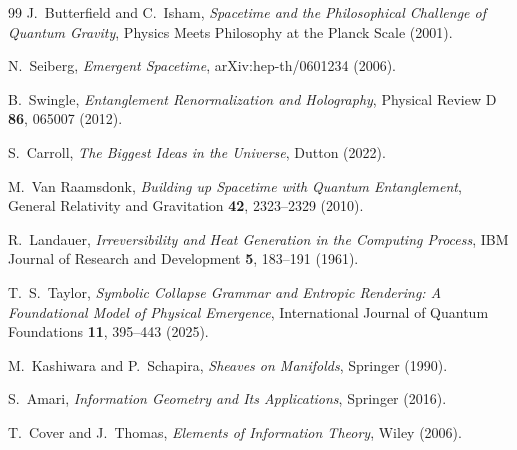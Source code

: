 \documentclass[12pt,a4paper]{article}
\theoremstyle{plain}
\theoremstyle{definition}
\theoremstyle{remark}
\begin{document}
\begin{thebibliography}{99}
J.~Butterfield and C.~Isham,
\emph{Spacetime and the Philosophical Challenge of Quantum Gravity},
Physics Meets Philosophy at the Planck Scale (2001).

N.~Seiberg,
\emph{Emergent Spacetime},
arXiv:hep-th/0601234 (2006).

B.~Swingle,
\emph{Entanglement Renormalization and Holography},
Physical Review D \textbf{86}, 065007 (2012).

S.~Carroll,
\emph{The Biggest Ideas in the Universe},
Dutton (2022).

M.~Van Raamsdonk,
\emph{Building up Spacetime with Quantum Entanglement},
General Relativity and Gravitation \textbf{42}, 2323--2329 (2010).

R.~Landauer,
\emph{Irreversibility and Heat Generation in the Computing Process},
IBM Journal of Research and Development \textbf{5}, 183--191 (1961).

T.~S.~Taylor,
\emph{Symbolic Collapse Grammar and Entropic Rendering:
A Foundational Model of Physical Emergence},
International Journal of Quantum Foundations \textbf{11}, 395--443 (2025).

M.~Kashiwara and P.~Schapira,
\emph{Sheaves on Manifolds},
Springer (1990).

S.~Amari,
\emph{Information Geometry and Its Applications},
Springer (2016).

T.~Cover and J.~Thomas,
\emph{Elements of Information Theory},
Wiley (2006).

\end{thebibliography}
\end{document}
